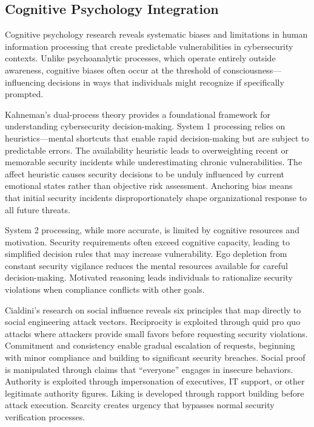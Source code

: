 \documentclass[11pt,a4paper]{article}
\begin{document}
\subsection{Cognitive Psychology Integration}

Cognitive psychology research reveals systematic biases and limitations in human information processing that create predictable vulnerabilities in cybersecurity contexts. Unlike psychoanalytic processes, which operate entirely outside awareness, cognitive biases often occur at the threshold of consciousness—influencing decisions in ways that individuals might recognize if specifically prompted.

Kahneman's dual-process theory provides a foundational framework for understanding cybersecurity decision-making\cite{kahneman2011}. System 1 processing relies on heuristics—mental shortcuts that enable rapid decision-making but are subject to predictable errors. The availability heuristic leads to overweighting recent or memorable security incidents while underestimating chronic vulnerabilities. The affect heuristic causes security decisions to be unduly influenced by current emotional states rather than objective risk assessment. Anchoring bias means that initial security incidents disproportionately shape organizational response to all future threats.

System 2 processing, while more accurate, is limited by cognitive resources and motivation. Security requirements often exceed cognitive capacity, leading to simplified decision rules that may increase vulnerability. Ego depletion from constant security vigilance reduces the mental resources available for careful decision-making. Motivated reasoning leads individuals to rationalize security violations when compliance conflicts with other goals.

Cialdini's research on social influence reveals six principles that map directly to social engineering attack vectors\cite{cialdini2007}. Reciprocity is exploited through quid pro quo attacks where attackers provide small favors before requesting security violations. Commitment and consistency enable gradual escalation of requests, beginning with minor compliance and building to significant security breaches. Social proof is manipulated through claims that ``everyone'' engages in insecure behaviors. Authority is exploited through impersonation of executives, IT support, or other legitimate authority figures. Liking is developed through rapport building before attack execution. Scarcity creates urgency that bypasses normal security verification processes.
\end{document}
